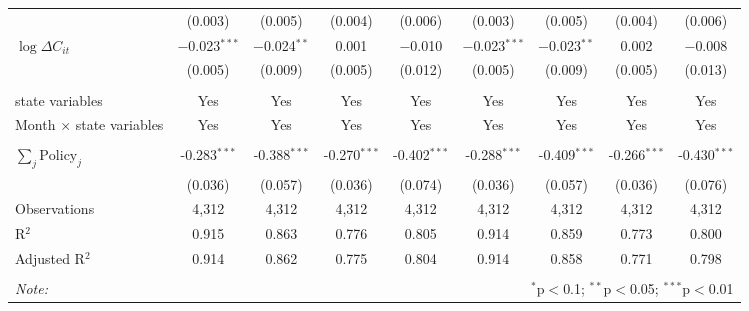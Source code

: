 \begin{tabular}{@{\extracolsep{1pt}}lcccccccc}
  & (0.003) & (0.005) & (0.004) & (0.006) & (0.003) & (0.005) & (0.004) & (0.006) \\ 
  $\log \Delta C_{it}$ & $-$0.023$^{***}$ & $-$0.024$^{**}$ & 0.001 & $-$0.010 & $-$0.023$^{***}$ & $-$0.023$^{**}$ & 0.002 & $-$0.008 \\ 
  & (0.005) & (0.009) & (0.005) & (0.012) & (0.005) & (0.009) & (0.005) & (0.013) \\ 
 \hline \\[-1.8ex] 
state variables & Yes & Yes & Yes & Yes & Yes & Yes & Yes & Yes \\ 
Month $\times$ state variables & Yes & Yes & Yes & Yes & Yes & Yes & Yes & Yes \\ 
\hline \\[-1.8ex] 
$\sum_j \mathrm{Policy}_j$ & -0.283$^{***}$ & -0.388$^{***}$ & -0.270$^{***}$ & -0.402$^{***}$ & -0.288$^{***}$ & -0.409$^{***}$ & -0.266$^{***}$ & -0.430$^{***}$ \\ 
 & (0.036) & (0.057) & (0.036) & (0.074) & (0.036) & (0.057) & (0.036) & (0.076) \\ 
Observations & 4,312 & 4,312 & 4,312 & 4,312 & 4,312 & 4,312 & 4,312 & 4,312 \\ 
R$^{2}$ & 0.915 & 0.863 & 0.776 & 0.805 & 0.914 & 0.859 & 0.773 & 0.800 \\ 
Adjusted R$^{2}$ & 0.914 & 0.862 & 0.775 & 0.804 & 0.914 & 0.858 & 0.771 & 0.798 \\ 
\hline 
\hline \\[-1.8ex] 
\textit{Note:}  & \multicolumn{8}{r}{$^{*}$p$<$0.1; $^{**}$p$<$0.05; $^{***}$p$<$0.01} \\ 
\end{tabular} 